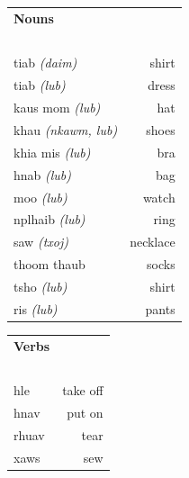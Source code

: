 \documentclass{article}
\begin{document}
\clearpage

\begin{multicols}{2}
[
\section*{}
]

\begin{tabular}{l r}
\textbf{Nouns} \\
~\\
tiab {\em (daim)} &shirt\\
tiab {\em (lub)} &dress\\
kaus mom {\em (lub)} &hat\\
khau {\em (nkawm, lub)} &shoes\\
khia mis {\em (lub)} &bra\\
hnab {\em (lub)} &bag\\
moo {\em (lub)} &watch\\
nplhaib {\em (lub)} &ring\\
saw {\em (txoj)} &necklace\\
thoom thaub &socks\\
tsho {\em (lub)} &shirt\\
ris {\em (lub)} &pants\\
\end{tabular}

\begin{tabular}{l r}
\textbf{Verbs} \\
~\\
hle &take off\\
hnav &put on\\
rhuav &tear\\
xaws &sew\\
\end{tabular}

\end{multicols}

\clearpage
\end{document}
